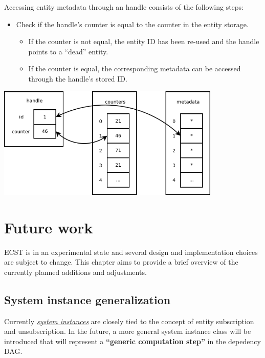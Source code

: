 \documentclass[twoside, 12pt, a4paper, openany]{book}
\let\origfigure=\figure
\let\endorigfigure=\endfigure
\renewenvironment{figure}[1][]{%
\origfigure[H]
}{%
\endorigfigure
}
\begin{document}
Accessing entity metadata through an handle consists of the following
steps:

\begin{itemize}
\item
  Check if the handle's counter is equal to the counter in the entity
  storage.

  \begin{itemize}
  \item
    If the counter is not equal, the entity ID has been re-used and the
    handle points to a ``dead'' entity.
  \item
    If the counter is equal, the corresponding metadata can be accessed
    through the handle's stored ID.
  \end{itemize}
\end{itemize}

\begin{figure}[htbp]
\centering
\includegraphics[width=0.80000\textwidth]{source/figures/handle.png}
\caption{ECST advanced features: accessing entity metadata through
handle}\label{handlepic}
\end{figure}

\chapter{Future work}\label{future-work}

ECST is in an experimental state and several design and implementation
choices are subject to change. This chapter aims to provide a brief
overview of the currently planned additions and adjustments.

\section{System instance
generalization}\label{system-instance-generalization}

Currently \protect\hyperlink{storage_system}{\emph{system instances}}
are closely tied to the concept of entity subscription and
unsubscription. In the future, a more general system instance class will
be introduced that will represent a \textbf{``generic computation
step''} in the depedency DAG.
\end{document}
